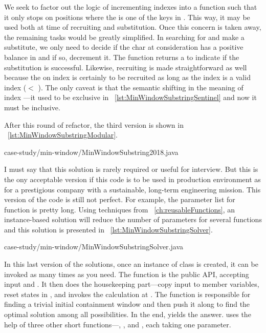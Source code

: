We seek to factor out the
logic of incrementing indexes into a function such that it only stops on positions where the
is one of the keys in .
This way, it may be used both at time of  recruiting and  substitution.
Once this concern is taken away, the remaining tasks would be greatly simplified.
In searching for and make a  substitute, we only need to decide if the char at
consideration has a positive balance in  and if so, decrement it.
The function returns a  to indicate if the substitution is successful.
Likewise, recruiting is made straightforward as well because the  on index
 is certainly to be recruited as long as the index is a valid index ($<$ ).
The only caveat is that the semantic shifting in the meaning of index ---it used to
be exclusive in ~\autoref{lst:MinWindowSubstringSentinel} and now it must be inclusive.

After this round of refactor, the third version is shown in
~\autoref{lst:MinWindowSubstringModular}.


{case-study/min-window/MinWindowSubstring2018.java}

I must say that this solution is rarely required or useful for interview.
But this is the ony acceptable version if this code is to be used in production
environment as for a prestigious company with a sustainable, long-term engineering mission.
This version of the code is still not perfect.
For example, the parameter list for function  is pretty long.
Using techniques from ~\autoref{ch:reusableFunctions},
an instance-based solution will reduce the number of parameters for several functions and this
solution is presented in ~\autoref{lst:MinWindowSubstringSolver}.


{case-study/min-window/MinWindowSubstringSolver.java}

In this last version of the solutions, once an instance of class 
is created, it can be invoked as many times as you need.
The function  is the public API, accepting input  and .
It then does the housekeeping part---copy input to member variables, reset states in
, and invokes the calculation at .
The  function is responsible for finding a trivial initial containment window and
then push it along to find the optimal solution among all possibilities.
In the end,  yields the answer.
 uses the help of three other short functions---, , and
, each taking one parameter.

